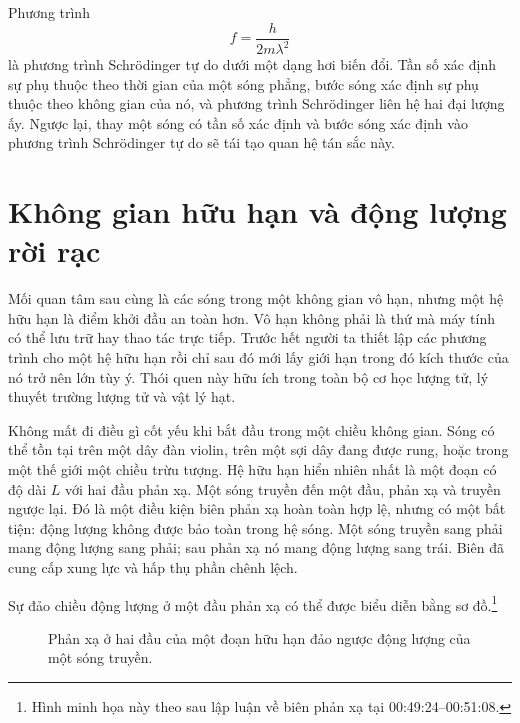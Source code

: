 Phương trình
\begin{equation}
f=\frac{h}{2m\lambda^2}
\end{equation}
là phương trình Schr\"odinger tự do dưới một dạng hơi biến đổi. Tần số xác định sự phụ thuộc theo thời gian của một sóng phẳng, bước sóng xác định sự phụ thuộc theo không gian của nó, và phương trình Schr\"odinger liên hệ hai đại lượng ấy. Ngược lại, thay một sóng có tần số xác định và bước sóng xác định vào phương trình Schr\"odinger tự do sẽ tái tạo quan hệ tán sắc này.

\begin{classroomqa}
\end{classroomqa}

\section{Không gian hữu hạn và động lượng rời rạc}

Mối quan tâm sau cùng là các sóng trong một không gian vô hạn, nhưng một hệ hữu hạn là điểm khởi đầu an toàn hơn. Vô hạn không phải là thứ mà máy tính có thể lưu trữ hay thao tác trực tiếp. Trước hết người ta thiết lập các phương trình cho một hệ hữu hạn rồi chỉ sau đó mới lấy giới hạn trong đó kích thước của nó trở nên lớn tùy ý. Thói quen này hữu ích trong toàn bộ cơ học lượng tử, lý thuyết trường lượng tử và vật lý hạt.

Không mất đi điều gì cốt yếu khi bắt đầu trong một chiều không gian. Sóng có thể tồn tại trên một dây đàn violin, trên một sợi dây đang được rung, hoặc trong một thế giới một chiều trừu tượng. Hệ hữu hạn hiển nhiên nhất là một đoạn có độ dài \(L\) với hai đầu phản xạ. Một sóng truyền đến một đầu, phản xạ và truyền ngược lại. Đó là một điều kiện biên phản xạ hoàn toàn hợp lệ, nhưng có một bất tiện: động lượng không được bảo toàn trong hệ sóng. Một sóng truyền sang phải mang động lượng sang phải; sau phản xạ nó mang động lượng sang trái. Biên đã cung cấp xung lực và hấp thụ phần chênh lệch.

Sự đảo chiều động lượng ở một đầu phản xạ có thể được biểu diễn bằng sơ đồ.\footnote{Hình minh họa này theo sau lập luận về biên phản xạ tại 00:49:24--00:51:08.}

\begin{figure}[t]
\centering
{}
\caption{Phản xạ ở hai đầu của một đoạn hữu hạn đảo ngược động lượng của một sóng truyền.}
\end{figure}


